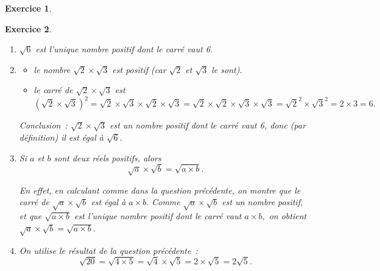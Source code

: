 \documentclass[10pt]{article}
\newtheorem{exo}{Exercice}
\begin{document}
\begin{exo}
\begin{enumerate}





\end{enumerate}
\end{exo}

\begin{exo}%
\begin{enumerate}
\item $\sqrt{6}$ est l'unique nombre positif dont le carré vaut 6.
\item \begin{itemize}
\item[\textbullet] le nombre $\sqrt{2}\times\sqrt{3}$ est positif (car $\sqrt{2}$ et $\sqrt{3}$ le sont).
\item[\textbullet] le carré de $\sqrt{2}\times\sqrt{3}$ est
\[\left(\sqrt{2}\times\sqrt{3}\right)^2=\sqrt{2}\times\sqrt{3}\times \sqrt{2}\times\sqrt{3}=\sqrt{2}\times\sqrt{2}\times \sqrt{3}\times\sqrt{3}=\sqrt{2}^2\times\sqrt{3}^2=2\times 3=6.\]
\end{itemize}

\medskip

Conclusion~: $\sqrt{2}\times\sqrt{3}$ est un nombre positif dont le carré vaut 6, donc (par définition) il est égal à $\sqrt{6}.$

\item Si $a$ et $b$ sont deux réels positifs, alors \[\sqrt{a}\times \sqrt{b}=\sqrt{a\times b}.\]

En effet, en calculant comme dans la question précédente, on montre que le carré de $\sqrt{a}\times \sqrt{b}$ est égal à $a\times b.$ Comme $\sqrt{a}\times \sqrt{b}$ est un nombre positif, et que $\sqrt{a\times b}$ est l'unique nombre positif dont le carré vaut $a\times b,$ on obtient $\sqrt{a}\times \sqrt{b}=\sqrt{a\times b}.$
\item On utilise le résultat de la question précédente~:
\[\sqrt{20}=\sqrt{4\times 5}=\sqrt{4}\times \sqrt{5}=2\times \sqrt{5}=2 \sqrt{5}.\]
\end{enumerate}
\end{exo}
\end{document}
